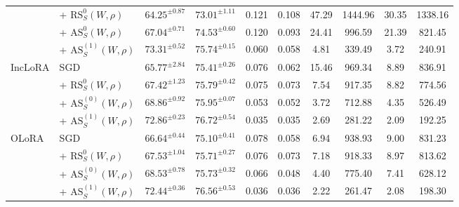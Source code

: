 \documentclass{article}
\theoremstyle{plain}
\theoremstyle{definition}
\theoremstyle{remark}
\begin{document}
{\begin{table}[ht]
{\begin{tabular}{@{}p{1.15cm} p{1.8cm} c c c c c c c c@{}}
& + $\mathrm{RS}^{0}_S(W,\rho)$  &$64.25^{\pm 0.87}$ & $73.01^{\pm 1.11}$ &0.121 &0.108 &47.29 &1444.96 &30.35 &1338.16\\
& + $\mathrm{AS}^{0}_S(W,\rho)$    &$67.04^{\pm 0.71}$ & $74.53^{\pm 0.60}$ & 0.120  & 0.093 & 24.41   & 996.59   & 21.39  & 821.45   \\
 & + $\mathrm{AS}^{(1)}_S(W,\rho)$   &$73.31^{\pm 0.52}$ & $75.74^{\pm 0.15}$  & 0.060  &0.058  & 4.81    & 339.49   & 3.72   & 240.91   \\
\midrule
\multirow{4}{*}{{IncLoRA}}
& SGD    &$65.77^{\pm 2.84}$  &$75.41^{\pm 0.26}$ & 0.076    & 0.062 & 15.46 & 969.34  & 8.89  & 836.91 \\
& + $\mathrm{RS}^{0}_S(W,\rho)$ & $67.42^{\pm 1.23}$ & $75.79^{\pm 0.42}$  &0.075 &0.073 &7.54 &917.35 &8.82 &774.56\\
& + $\mathrm{AS}^{(0)}_S(W,\rho)$    &$68.86^{\pm 0.92}$ & $75.95^{\pm 0.07}$  & 0.053   & 0.052 & 3.72    & 712.88   & 4.35   & 526.49   \\
 &+ $\mathrm{AS}^{(1)}_S(W,\rho)$  &$72.86^{\pm 0.23}$ & $76.72^{\pm 0.54}$  & 0.035   & 0.035 & 2.69    & 281.22   & 2.09   & 192.25   \\
\midrule
\multirow{4}{*}{{OLoRA}}
& SGD    &$66.64^{\pm 0.44}$ & $75.10^{\pm 0.41}$  & 0.078   & 0.058 & 6.94    & 938.93   & 9.00   & 831.23   \\
& + $\mathrm{RS}^{0}_S(W,\rho)$  & $67.53^{\pm 1.04}$ & $75.71^{\pm 0.27}$  &0.076 &0.073 &7.18 &918.33 &8.97 &813.62\\
& + $\mathrm{AS}^{(0)}_S(W,\rho)$     &$68.53^{\pm 0.78}$ & $75.73^{\pm 0.32}$  & 0.066   & 0.048 & 4.40    & 775.40   & 7.41   & 628.12   \\
 & + $\mathrm{AS}^{(1)}_S(W,\rho)$  &$72.44^{\pm 0.36}$ & $76.56^{\pm 0.53}$  & 0.036   & 0.036 & 2.22    & 261.47   & 2.08   & 198.30\\
\bottomrule
\end{tabular}
}
\end{table}
} 
\end{document}
